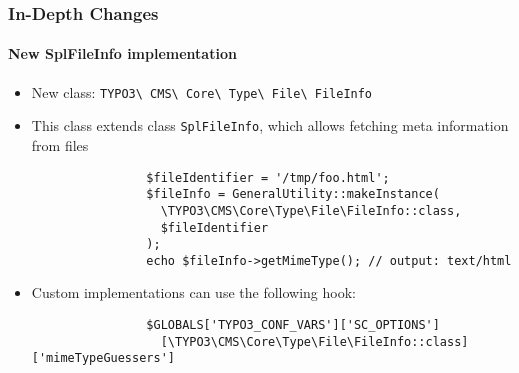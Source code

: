 
\begin{frame}[fragile]
	\frametitle{In-Depth Changes}
	\framesubtitle{New SplFileInfo implementation}

	\lstset{basicstyle=\smaller\ttfamily}

	\begin{itemize}

		\item New class:
			\texttt{TYPO3\textbackslash
				CMS\textbackslash
				Core\textbackslash
				Type\textbackslash
				File\textbackslash
				FileInfo}

		\item This class extends class \texttt{SplFileInfo}, which allows fetching meta information from files

			\begin{lstlisting}
				$fileIdentifier = '/tmp/foo.html';
				$fileInfo = GeneralUtility::makeInstance(
				  \TYPO3\CMS\Core\Type\File\FileInfo::class,
				  $fileIdentifier
				);
				echo $fileInfo->getMimeType(); // output: text/html
			\end{lstlisting}

		\item Custom implementations can use the following hook:

			\begin{lstlisting}
				$GLOBALS['TYPO3_CONF_VARS']['SC_OPTIONS']
				  [\TYPO3\CMS\Core\Type\File\FileInfo::class]['mimeTypeGuessers']
			\end{lstlisting}

	\end{itemize}

\end{frame}


